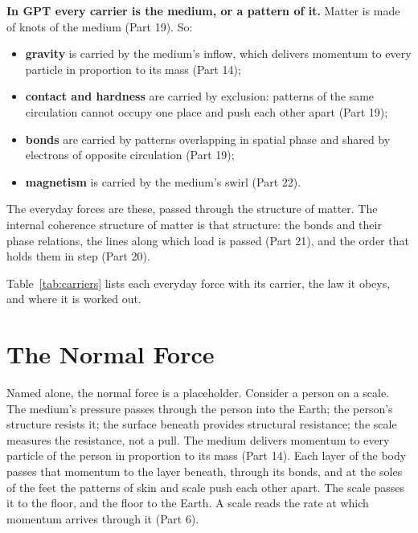 \documentclass[11pt,a4paper]{article}
\begin{document}
\begin{hypbar}
\textbf{In GPT every carrier is the medium, or a pattern of it.} Matter is made of knots of the medium (Part 19).\footnotemark{} So:
\begin{itemize}
\item \textbf{gravity} is carried by the medium's inflow, which delivers momentum to every particle in proportion to its mass (Part 14);
\item \textbf{contact and hardness} are carried by exclusion: patterns of the same circulation cannot occupy one place and push each other apart (Part 19);
\item \textbf{bonds} are carried by patterns overlapping in spatial phase and shared by electrons of opposite circulation (Part 19);
\item \textbf{magnetism} is carried by the medium's swirl (Part 22).\footnotemark{}
\end{itemize}
The everyday forces are these, passed through the structure of matter. The internal coherence structure of matter is that structure: the bonds and their phase relations, the lines along which load is passed (Part 21), and the order that holds them in step (Part 20).
\end{hypbar}
\addtocounter{footnote}{-1}

Table~\ref{tab:carriers} lists each everyday force with its carrier, the law it obeys, and where it is worked out.

\section{The Normal Force}

Named alone, the normal force is a placeholder. Consider a person on a scale. The medium's pressure passes through the person into the Earth; the person's structure resists it; the surface beneath provides structural resistance; the scale measures the resistance, not a pull.  The medium delivers momentum to every particle of the person in proportion to its mass (Part 14). Each layer of the body passes that momentum to the layer beneath, through its bonds, and at the soles of the feet the patterns of skin and scale push each other apart. The scale passes it to the floor, and the floor to the Earth. A scale reads the rate at which momentum arrives through it (Part 6).
\end{document}

